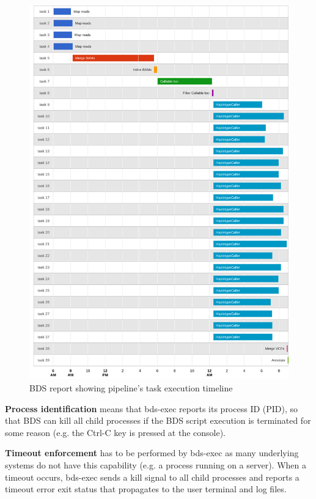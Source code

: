 \begin{figure}
    \centering
    \includegraphics[width=14cm]{bds_figure_3_small.png}
    \caption{BDS report showing pipeline’s task execution timeline}
    \label{fig:bdsreport}
\end{figure}

\textbf{Process identification} means that bds-exec reports its process ID (PID), so that BDS can kill all child processes if the BDS script execution is terminated for some reason (e.g. the Ctrl-C key is pressed at the console).

\textbf{Timeout enforcement} has to be performed by bds-exec as many underlying systems do not have this capability (e.g. a process running on a server). When a timeout occurs, bds-exec sends a kill signal to all child processes and reports a timeout error exit status that propagates to the user terminal and log files.

